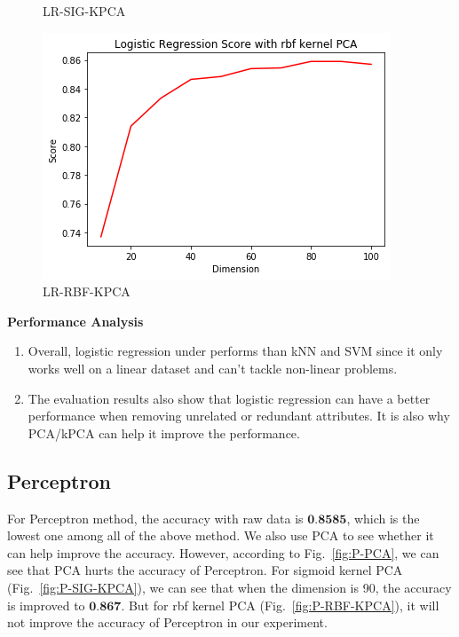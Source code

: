 \documentclass[12pt]{article}
\begin{document}
\begin{figure}[htb]
\begin{minipage}{0.3\textwidth}
		\caption{LR-SIG-KPCA}
		\label{fig:LR-SIG-KPCA}
	\end{minipage}
	\begin{minipage}{0.3\textwidth}
		\centering
		\includegraphics[width=\linewidth]{./exp-figs/LR-RBF-KPCA.png}
		\caption{LR-RBF-KPCA}
		\label{fig:LR-RBF-KPCA}
	\end{minipage}
\end{figure}

\textbf{Performance Analysis} 
\begin{enumerate}[label=(\roman*)]
	\item Overall, logistic regression under performs than kNN and SVM since it only works well on a linear dataset and can't tackle non-linear problems.
	\item The evaluation results also show that logistic regression can have a better performance when removing unrelated or redundant attributes. It is also why PCA/kPCA can help it improve the performance.
\end{enumerate}

\subsection{Perceptron}
For Perceptron method, the accuracy with raw data is $\textbf{0.8585}$, which is the lowest one among all of the above method. We also use PCA to see whether it can help improve the accuracy. However, according to Fig.~\ref{fig:P-PCA}, we can see that PCA hurts the accuracy of Perceptron. For sigmoid kernel PCA (Fig.~\ref{fig:P-SIG-KPCA}), we can see that when the dimension is 90, the accuracy is improved to $\textbf{0.867}$. But for rbf kernel PCA (Fig.~\ref{fig:P-RBF-KPCA}), it will not improve the accuracy of Perceptron in our experiment.
\end{document}
